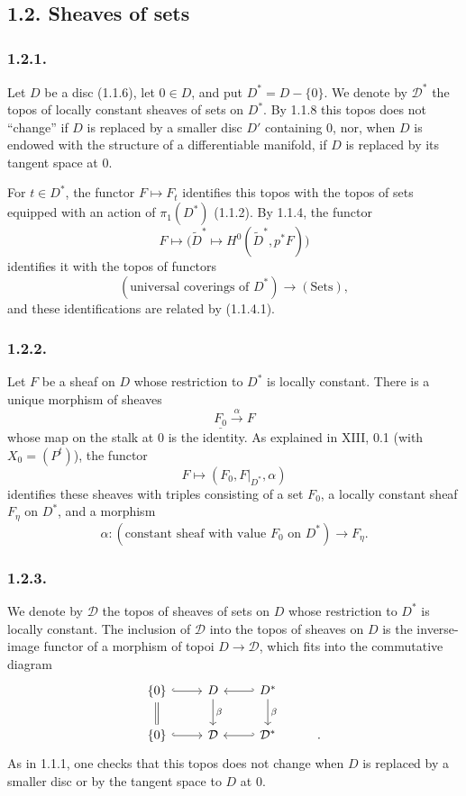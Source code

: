 \subsection*{1.2. Sheaves of sets}

\subsubsection*{1.2.1.}
Let $D$ be a disc (1.1.6), let $0\in D$, and put
$D^*=D-\{0\}$.  We denote by $\mathcal D^*$ the topos of locally
constant sheaves of sets on $D^*$.  By 1.1.8 this topos does not
``change'' if $D$ is replaced by a smaller disc $D'$ containing $0$,
nor, when $D$ is endowed with the structure of a differentiable
manifold, if $D$ is replaced by its tangent space at $0$.

For $t\in D^*$, the functor $F\longmapsto F_t$ identifies this topos
with the topos of sets equipped with an action of $\pi_1(D^*)$
(1.1.2).  By 1.1.4, the functor
\[
F\longmapsto
\bigl(\widetilde D^*\longmapsto
H^0(\widetilde D^*,p^*F)\bigr)
\]
identifies it with the topos of functors
\[
(\text{universal coverings of }D^*)
\longrightarrow(\mathrm{Sets}),
\]
and these identifications are related by (1.1.4.1).

\subsubsection*{1.2.2.}
Let $F$ be a sheaf on $D$ whose restriction to $D^*$ is locally
constant.  There is a unique morphism of sheaves
\[
\underline{F_0}\xrightarrow{\ \alpha\ }F
\]
whose map on the stalk at $0$ is the identity.  As explained in
XIII, 0.1 (with $X_0=(P^t)$), the functor
\[
F\longmapsto(F_0,F|_{D^*},\alpha)
\]
identifies these sheaves with triples consisting of a set $F_0$, a
locally constant sheaf $F_\eta$ on $D^*$, and a morphism
\[
\alpha:
(\text{constant sheaf with value }F_0\text{ on }D^*)
\longrightarrow F_\eta.
\]

\subsubsection*{1.2.3.}
We denote by $\mathcal D$ the topos of sheaves of sets on $D$ whose
restriction to $D^*$ is locally constant.  The inclusion of
$\mathcal D$ into the topos of sheaves on $D$ is the inverse-image
functor of a morphism of topoi $D\longrightarrow\mathcal D$, which
fits into the commutative diagram
\[
\begin{tikzcd}
\{0\} \arrow[r, hook] \arrow[d, equal]
  & D \arrow[d, "\beta"]
  & D^* \arrow[l, hook'] \arrow[d, "\beta"] & {} \\
\{0\} \arrow[r, hook]
  & \mathcal D
  & \mathcal D^* \arrow[l, hook'] & {}.
\end{tikzcd}
\]
As in 1.1.1, one checks that this topos does not change when $D$ is
replaced by a smaller disc or by the tangent space to $D$ at $0$.

